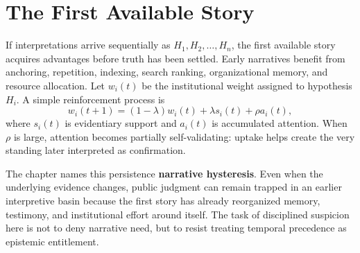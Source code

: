
\chapter{The First Available Story}
\label{ch:ch003}


If interpretations arrive sequentially as \(H_1,H_2,\ldots,H_n\), the first available story acquires advantages before truth has been settled. Early narratives benefit from anchoring, repetition, indexing, search ranking, organizational memory, and resource allocation. Let \(w_i(t)\) be the institutional weight assigned to hypothesis \(H_i\). A simple reinforcement process is
\[
w_i(t+1)
=
(1-\lambda)w_i(t)
+
\lambda s_i(t)
+
\rho a_i(t),
\]
where \(s_i(t)\) is evidentiary support and \(a_i(t)\) is accumulated attention. When \(\rho\) is large, attention becomes partially self-validating: uptake helps create the very standing later interpreted as confirmation.

The chapter names this persistence \textbf{narrative hysteresis}. Even when the underlying evidence changes, public judgment can remain trapped in an earlier interpretive basin because the first story has already reorganized memory, testimony, and institutional effort around itself. The task of disciplined suspicion here is not to deny narrative need, but to resist treating temporal precedence as epistemic entitlement.
